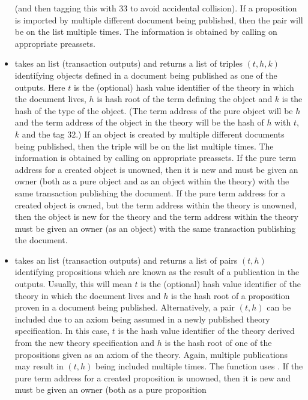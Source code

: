 \begin{itemize}
(and then tagging this with $33$ to avoid accidental collision).
If a proposition is imported by multiple
different document being published, then the pair will be on the list multiple times.
The information is obtained by calling {} on appropriate preassets.
\item {} takes
an {} list (transaction outputs)
and returns a list of triples $(t,h,k)$
identifying objects defined in a document being published as one of the outputs.
Here $t$ is the (optional) hash value identifier of the theory in which the document lives,
$h$ is hash root of the term defining the object
and $k$ is the hash of the type of the object.
(The term address of the pure object will be $h$
and the term address of the object in the theory will be the hash of
$h$ with $t$, $k$ and the tag $32$.)
If an object is created by multiple
different documents being published, then the triple will be on the list multiple times.
The information is obtained by calling {} on appropriate preassets.
If the pure term address for a created object is unowned,
then it is new and must be given an owner (both as a pure object
and as an object within the theory) with the same transaction
publishing the document.
If the pure term address for a created object is owned,
but the term address within the theory is unowned, then
the object is new for the theory and the term address within the theory
must be given an owner (as an object) with the same transaction
publishing the document.
\item {} takes
an {} list (transaction outputs)
and returns a list of pairs $(t,h)$
identifying propositions which are known as the result of a publication in the outputs.
Usually, this will mean $t$ is the (optional) hash value identifier of the theory in which the document lives
and $h$ is the hash root of a proposition proven in a document being published.
Alternatively, a pair $(t,h)$ can be included due to an axiom being assumed in a newly published theory
specification. In this case, $t$ is the hash value identifier of the theory derived from the
new theory specification and $h$ is the hash root of one of the propositions given as an axiom of the theory.
Again, multiple publications may result in $(t,h)$ being included multiple times.
The function uses {}.
If the pure term address for a created proposition is unowned,
then it is new and must be given an owner (both as a pure proposition

\end{itemize}
